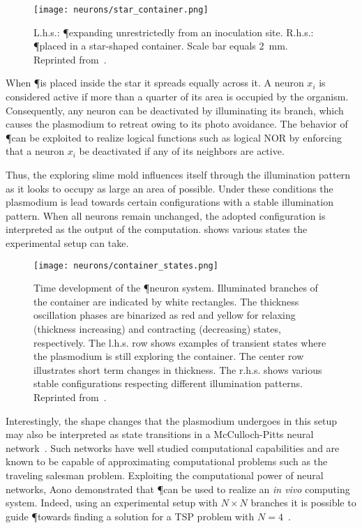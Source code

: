 			\begin{figure}[!htbp]
			\centering
			\texttt{[image: neurons/star\_container.png]}
			\caption[\P neurons setup]{L.h.s.: \P expanding unrestrictedly from an inoculation site. R.h.s.: \P placed in a star-shaped container. Scale bar equals \SI{2}{\milli\metre}. Reprinted from~\cite{Aono:2007:ANC:1284621.1284651}.}
			\label{fig:neurons_setup}
			\end{figure}

			When \P is placed inside the star it spreads equally across it. A neuron $x_i$ is considered active if more than a quarter of its area is occupied by the organism. Consequently, any neuron can be deactivated by illuminating its branch, which causes the plasmodium to retreat owing to its photo avoidance. The behavior of \P can be exploited to realize logical functions such as logical NOR by enforcing that a neuron $x_i$ be deactivated if any of its neighbors are active. 

			Thus, the exploring slime mold influences itself through the illumination pattern as it looks to occupy as large an area of possible. Under these conditions the plasmodium is lead towards certain configurations with a stable illumination pattern. When all neurons remain unchanged, the adopted configuration is interpreted as the output of the computation.  shows various states the experimental setup can take.

			\begin{figure}[!htbp]
			\centering
			\texttt{[image: neurons/container\_states.png]}
			\caption[\P neurons undergoing state transitions]{Time development of the \P neuron system. Illuminated branches of the container are indicated by white rectangles. The thickness oscillation phases are binarized as red and yellow for relaxing (thickness increasing) and contracting (decreasing) states, respectively. The l.h.s. row shows examples of transient states where the plasmodium is still exploring the container. The center row illustrates short term changes in thickness. The r.h.s. shows various stable configurations respecting different illumination patterns. Reprinted from~\cite{Aono:2007:ANC:1284621.1284651}. }
			\label{fig:neurons_states}
			\end{figure}

			Interestingly, the shape changes that the plasmodium undergoes in this setup may also be interpreted as state transitions in a McCulloch-Pitts neural network~\cite{Aono:2007:ANC:1284621.1284651}. Such networks have well studied computational capabilities and are known to be capable of approximating computational problems such as the traveling salesman problem. Exploiting the computational power of neural networks, Aono \etal demonstrated that \P can be used to realize an \textit{in vivo} computing system. Indeed, using an experimental setup with $N \times N$ branches it is possible to guide \P towards finding a solution for a TSP problem with $N=4$~\cite{Aono2009}. 

